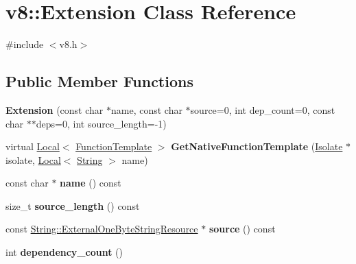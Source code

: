 \hypertarget{classv8_1_1Extension}{}\section{v8\+:\+:Extension Class Reference}
\label{classv8_1_1Extension}


{\ttfamily \#include $<$v8.\+h$>$}

\subsection*{Public Member Functions}
\begin{DoxyCompactItemize}
\item 
\mbox{\label{classv8_1_1Extension_a10868673b7801cc1139ca3bc09bcfcf6}} 
{\bfseries Extension} (const char $\ast$name, const char $\ast$source=0, int dep\+\_\+count=0, const char $\ast$$\ast$deps=0, int source\+\_\+length=-\/1)
\item 
\mbox{\label{classv8_1_1Extension_ad19cfbd67437153672b65e048d672bb0}} 
virtual \mbox{\hyperlink{classv8_1_1Local}{Local}}$<$ \mbox{\hyperlink{classv8_1_1FunctionTemplate}{Function\+Template}} $>$ {\bfseries Get\+Native\+Function\+Template} (\mbox{\hyperlink{classv8_1_1Isolate}{Isolate}} $\ast$isolate, \mbox{\hyperlink{classv8_1_1Local}{Local}}$<$ \mbox{\hyperlink{classv8_1_1String}{String}} $>$ name)
\item 
\mbox{\label{classv8_1_1Extension_a2aa7793ae4322dd8c1f15362e4b13244}} 
const char $\ast$ {\bfseries name} () const
\item 
\mbox{\label{classv8_1_1Extension_a61a481f21654fc3d8007453dc7ef92e3}} 
size\+\_\+t {\bfseries source\+\_\+length} () const
\item 
\mbox{\label{classv8_1_1Extension_a5ffec9002da1eb1390a06ca02fcfcc0a}} 
const \mbox{\hyperlink{classv8_1_1String_1_1ExternalOneByteStringResource}{String\+::\+External\+One\+Byte\+String\+Resource}} $\ast$ {\bfseries source} () const
\item 
\mbox{\label{classv8_1_1Extension_a7623b08e3bc42d903bd923a00317b7f9}} 
int {\bfseries dependency\+\_\+count} ()
$$
\end{DoxyCompactItemize}
